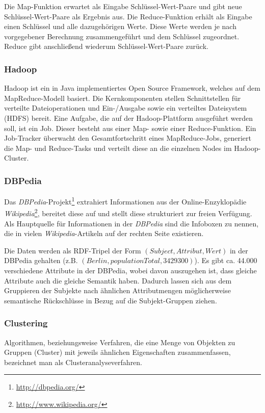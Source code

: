 \documentclass[a4paper]{llncs}
\begin{document}
Die Map-Funktion erwartet als Eingabe Schlüssel-Wert-Paare und gibt neue Schlüssel-Wert-Paare als Ergebnis aus.
Die Reduce-Funktion erhält als Eingabe einen Schlüssel und alle dazugehörigen Werte.
Diese Werte werden je nach vorgegebener Berechnung zusammengeführt und dem Schlüssel zugeordnet.
Reduce gibt anschließend wiederum Schlüssel-Wert-Paare zurück.

\subsubsection{Hadoop}
Hadoop ist ein in Java implementiertes Open Source Framework, welches auf dem MapReduce-Modell basiert.
Die Kernkomponenten stellen Schnittstellen für verteilte Dateioperationen und Ein-/Ausgabe sowie ein verteiltes Dateisystem (HDFS) bereit.
Eine Aufgabe, die auf der Hadoop-Plattform ausgeführt werden soll, ist ein Job.
Dieser besteht aus einer Map- sowie einer Reduce-Funktion.
Ein Job-Tracker überwacht den Gesamtfortschritt eines MapReduce-Jobs,
generiert die Map- und Reduce-Tasks und verteilt diese an die einzelnen Nodes im Hadoop-Cluster.

\subsubsection{DBPedia}
Das \emph{DBPedia}-Projekt\footnote{\url{http://dbpedia.org/}} extrahiert Informationen aus der Online-Enzyklopädie \emph{Wikipedia}\footnote{\url{http://www.wikipedia.org/}}, bereitet diese auf und stellt diese strukturiert zur freien Verfügung.
Als Hauptquelle für Informationen in der \emph{DBPedia} sind die Infoboxen zu nennen, die in vielen \emph{Wikipedia}-Artikeln auf der rechten Seite existieren.

Die Daten werden als RDF-Tripel der Form $(Subject, Attribut, Wert)$ in der DBPedia gehalten (z.B. $(Berlin, populationTotal, 3429300)$).
Es gibt ca. 44.000 verschiedene Attribute in der DBPedia, wobei davon auszugehen ist, dass gleiche Attribute auch die gleiche Semantik haben. Dadurch lassen sich aus dem Gruppieren der Subjekte nach ähnlichen Attributmengen möglicherweise semantische Rückschlüsse in Bezug auf die Subjekt-Gruppen ziehen.

\subsubsection{Clustering}
Algorithmen, beziehungsweise Verfahren, die eine Menge von Objekten zu Gruppen (Cluster) mit jeweils ähnlichen Eigenschaften zusammenfassen, bezeichnet man als Clusteranalyseverfahren. %
\end{document}
